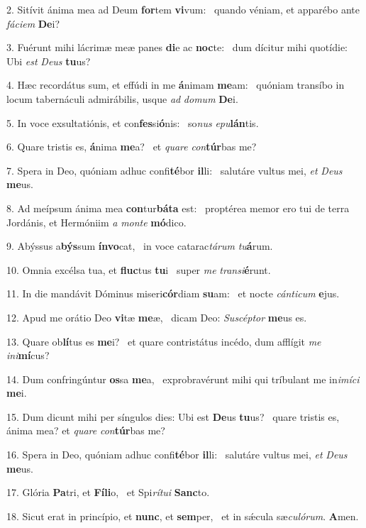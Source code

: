 2. Sitívit ánima mea ad Deum \textbf{for}tem \textbf{vi}vum: \ast\  quando véniam, et apparébo ante \textit{fá}\textit{ci}\textit{em} \textbf{De}i?\

3. Fuérunt mihi lácrimæ meæ panes \textbf{di}e ac \textbf{noc}te: \ast\  dum dícitur mihi quotídie: Ubi \textit{est} \textit{De}\textit{us} \textbf{tu}us?\

4. Hæc recordátus sum, et effúdi in me \textbf{á}nimam \textbf{me}am: \ast\  quóniam transíbo in locum tabernáculi admirábilis, usque \textit{ad} \textit{do}\textit{mum} \textbf{De}i.\

5. In voce exsultatiónis, et con\textbf{fes}si\textbf{ó}nis: \ast\  so\textit{nus} \textit{e}\textit{pu}\textbf{lán}tis.\

6. Quare tristis es, \textbf{á}nima \textbf{me}a? \ast\  et \textit{qua}\textit{re} \textit{con}\textbf{túr}bas me?\

7. Spera in Deo, quóniam adhuc confi\textbf{té}bor \textbf{il}li: \ast\  salutáre vultus mei, \textit{et} \textit{De}\textit{us} \textbf{me}us.\

8. Ad meípsum ánima mea \textbf{con}tur\textbf{bá}\textbf{ta} est: \ast\  proptérea memor ero tui de terra Jordánis, et Hermóniim \textit{a} \textit{mon}\textit{te} \textbf{mó}dico.\

9. Abýssus a\textbf{býs}sum \textbf{ín}\textbf{vo}cat, \ast\  in voce catarac\textit{tá}\textit{rum} \textit{tu}\textbf{á}rum.\

10. Omnia excélsa tua, et \textbf{fluc}tus \textbf{tu}i \ast\  super \textit{me} \textit{trans}\textit{i}\textbf{é}runt.\

11. In die mandávit Dóminus miseri\textbf{cór}diam \textbf{su}am: \ast\  et nocte \textit{cán}\textit{ti}\textit{cum} \textbf{e}jus.\

12. Apud me orátio Deo \textbf{vi}tæ \textbf{me}æ, \ast\  dicam Deo: \textit{Su}\textit{scép}\textit{tor} \textbf{me}us es.\

13. Quare ob\textbf{lí}tus es \textbf{me}i? \ast\  et quare contristátus incédo, dum afflígit \textit{me} \textit{in}\textit{i}\textbf{mí}cus?\

14. Dum confringúntur \textbf{os}sa \textbf{me}a, \ast\  exprobravérunt mihi qui tríbulant me in\textit{i}\textit{mí}\textit{ci} \textbf{me}i.\

15. Dum dicunt mihi per síngulos dies: Ubi est \textbf{De}us \textbf{tu}us? \ast\  quare tristis es, ánima mea? et \textit{qua}\textit{re} \textit{con}\textbf{túr}bas me?\

16. Spera in Deo, quóniam adhuc confi\textbf{té}bor \textbf{il}li: \ast\  salutáre vultus mei, \textit{et} \textit{De}\textit{us} \textbf{me}us.\

17. Glória \textbf{Pa}tri, et \textbf{Fí}\textbf{li}o, \ast\  et Spi\textit{rí}\textit{tu}\textit{i} \textbf{Sanc}to.\

18. Sicut erat in princípio, et \textbf{nunc}, et \textbf{sem}per, \ast\  et in sǽcula sæ\textit{cu}\textit{ló}\textit{rum}. \textbf{A}men.\

